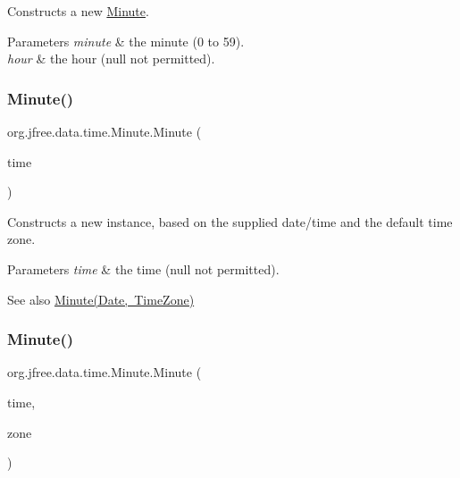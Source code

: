 Constructs a new \mbox{\hyperlink{classorg_1_1jfree_1_1data_1_1time_1_1_minute}{Minute}}.


\begin{DoxyParams}{Parameters}
{\em minute} & the minute (0 to 59). \\
\hline
{\em hour} & the hour ({\ttfamily null} not permitted). \\
\hline
\end{DoxyParams}
\mbox{\label{classorg_1_1jfree_1_1data_1_1time_1_1_minute_a9a576b004452a502adfdcb0888cefec7}} 
\subsubsection{\texorpdfstring{Minute()}{Minute()}\hspace{0.1cm}{\footnotesize\ttfamily [3/6]}}
{\footnotesize\ttfamily org.\+jfree.\+data.\+time.\+Minute.\+Minute (\begin{DoxyParamCaption}\item[{Date}]{time }\end{DoxyParamCaption})}

Constructs a new instance, based on the supplied date/time and the default time zone.


\begin{DoxyParams}{Parameters}
{\em time} & the time ({\ttfamily null} not permitted).\\
\hline
\end{DoxyParams}
\begin{DoxySeeAlso}{See also}
\mbox{\hyperlink{classorg_1_1jfree_1_1data_1_1time_1_1_minute_ad062e2fff5d17e0f359a73d9ca8a08a6}{Minute(\+Date, Time\+Zone)}} 
\end{DoxySeeAlso}
\mbox{\label{classorg_1_1jfree_1_1data_1_1time_1_1_minute_ad062e2fff5d17e0f359a73d9ca8a08a6}} 
\subsubsection{\texorpdfstring{Minute()}{Minute()}\hspace{0.1cm}{\footnotesize\ttfamily [4/6]}}
{\footnotesize\ttfamily org.\+jfree.\+data.\+time.\+Minute.\+Minute (\begin{DoxyParamCaption}\item[{Date}]{time,  }\item[{Time\+Zone}]{zone }\end{DoxyParamCaption})}

